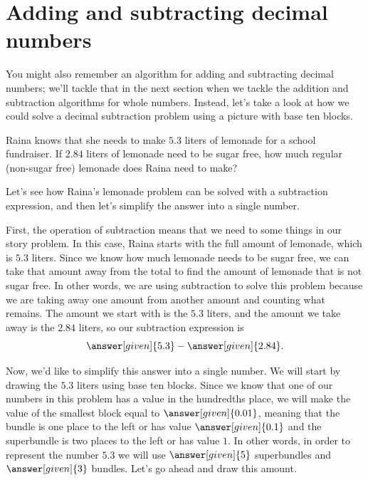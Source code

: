 \documentclass{ximera}
\begin{document}
\section{Adding and subtracting decimal numbers}

You might also remember an algorithm for adding and subtracting decimal numbers; we'll tackle that in the next section when we tackle the addition and subtraction algorithms for whole numbers. Instead, let's take a look at how we could solve a decimal subtraction problem using a picture with base ten blocks.

\begin{question}
Raina knows that she needs to make $5.3$ liters of lemonade for a school fundraiser. If $2.84$ liters of lemonade need to be sugar free, how much regular (non-sugar free) lemonade does Raina need to make?

\begin{explanation}
Let's see how Raina's lemonade problem can be solved with a subtraction expression, and then let's simplify the answer into a single number.

First, the operation of subtraction means that we need to  some things in our story problem. In this case, Raina starts with the full amount of lemonade, which is $5.3$ liters. Since we know how much lemonade needs to be sugar free, we can take that amount away from the total to find the amount of lemonade that is not sugar free. In other words, we are using subtraction to solve this problem because we are taking away one amount from another amount and counting what remains. The amount we start with is the $5.3$ liters, and the amount we take away is the $2.84$ liters, so our subtraction expression is
\[
\answer[given]{5.3} - \answer[given]{2.84}.
\]

Now, we'd like to simplify this answer into a single number. We will start by drawing the $5.3$ liters using base ten blocks. Since we know that one of our numbers in this problem has a value in the hundredths place, we will make the value of the smallest block equal to $\answer[given]{0.01}$, meaning that the bundle is one place to the left or has value $\answer[given]{0.1}$ and the superbundle is two places to the left or has value $1$. In other words, in order to represent the number $5.3$ we will use $\answer[given]{5}$ superbundles and $\answer[given]{3}$ bundles. Let's go ahead and draw this amount.

\begin{image}
\end{image}


\end{explanation}
\end{question}
\end{document}
